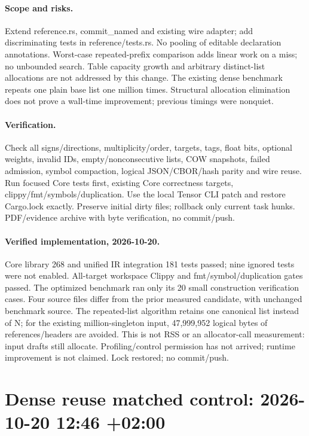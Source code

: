 \documentclass[11pt,a4paper]{article}
\begin{document}
\paragraph{Scope and risks.} Extend reference.rs, commit\_named and existing wire adapter;
add discriminating tests in reference/tests.rs. No pooling of editable declaration annotations.
Worst-case repeated-prefix comparison adds linear work on a miss; no unbounded search.
Table capacity growth and arbitrary distinct-list allocations are not addressed by this change.
The existing dense benchmark repeats one plain base list one million times. Structural
allocation elimination does not prove a wall-time improvement; previous timings were nonquiet.
\paragraph{Verification.} Check all signs/directions, multiplicity/order, targets, tags,
float bits, optional weights, invalid IDs, empty/nonconsecutive lists, COW snapshots,
failed admission, symbol compaction, logical JSON/CBOR/hash parity and wire reuse.
Run focused Core tests first, existing Core correctness targets, clippy/fmt/symbols/duplication.
Use the local Tensor CLI patch and restore Cargo.lock exactly. Preserve initial dirty files;
rollback only current task hunks. PDF/evidence archive with byte verification, no commit/push.

\paragraph{Verified implementation, 2026-10-20.} Core library 268 and unified IR
integration 181 tests passed; nine ignored tests were not enabled. All-target workspace
Clippy and fmt/symbol/duplication gates passed. The optimized benchmark ran only its
20 small construction verification cases. Four source files differ from the prior
measured candidate, with unchanged benchmark source. The repeated-list algorithm
retains one canonical list instead of N; for the existing million-singleton input,
47,999,952 logical bytes of references/headers are avoided. This is not RSS or an
allocator-call measurement: input drafts still allocate. Profiling/control permission
has not arrived; runtime improvement is not claimed. Lock restored; no commit/push.

\clearpage\section*{Dense reuse matched control: 2026-10-20 12:46 +02:00}
\end{document}
